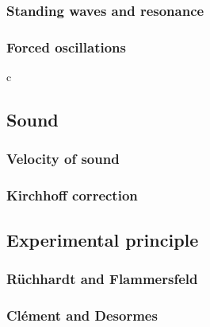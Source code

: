 \documentclass{subfiles}
\begin{document}
        \subsubsection*{Standing waves and resonance}

        \subsubsection*{Forced oscillations}
c
    \subsection{Sound}

        \subsubsection*{Velocity of sound}

        \subsubsection*{Kirchhoff correction}

        \subsection{Experimental principle}

        \subsubsection*{Rüchhardt and Flammersfeld}

        \subsubsection*{Clément and Desormes}


\end{document}
